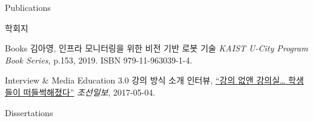 \begin{rSection}{Publications}
{\begin{pubSubsectionNum}{학회지}
  \end{pubSubsectionNum}

  \begin{pubSubsectionNum}{Books}
    김아영,
    인프라 모니터링을 위한 비전 기반 로봇 기술
    \textit{KAIST U-City Program Book Series}, p.153, 2019. ISBN 979-11-963039-1-4.

  \end{pubSubsectionNum}

  \begin{pubSubsectionNum}{Interview \& Media}
    Education 3.0 강의 방식 소개 인터뷰,
    \hyperlink{http://news.chosun.com/site/data/html_dir/2017/05/04/2017050400133.html}{``강의 없앤 강의실… 학생들이 떠들썩해졌다''}
    \textit{조선일보}, 2017-05-04.

  \end{pubSubsectionNum}
}

\begin{pubSubsectionNum}{Dissertations}
  \item {}
  \item {}
\end{pubSubsectionNum}


\end{rSection}
